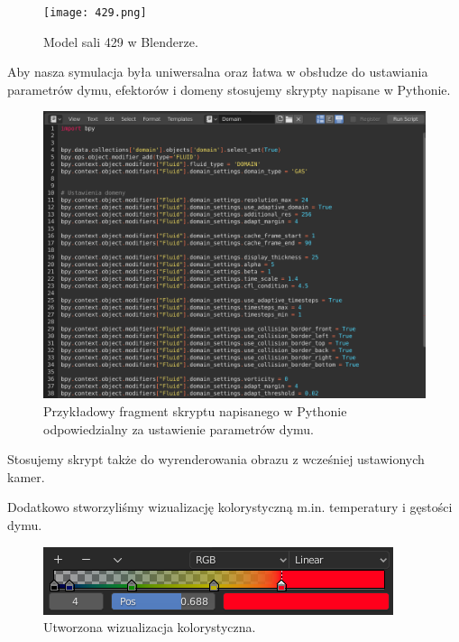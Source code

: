 \documentclass{article}
\begin{document}
            \newpage
            \begin{figure}[h]
                \centering
                \texttt{[image: 429.png]}
                \caption{Model sali 429 w Blenderze.}
            \end{figure}
            
            \medskip
            \noindent Aby nasza symulacja była uniwersalna oraz łatwa w obsłudze do ustawiania parametrów dymu, efektorów i domeny stosujemy skrypty napisane w Pythonie. 
        
            \medskip
            \begin{figure}[ht!]
                \centering
                \includegraphics[scale = 0.4]{sk2.png}
                \caption{Przykładowy fragment skryptu napisanego w Pythonie odpowiedzialny za ustawienie parametrów dymu.}
            \end{figure}
            
            \medskip
            \noindent Stosujemy skrypt także do wyrenderowania obrazu z wcześniej ustawionych kamer.
        
            \medskip
            \noindent Dodatkowo stworzyliśmy wizualizację kolorystyczną m.in. temperatury i gęstości dymu.
            
             \begin{figure}[ht!]
                \centering
                \includegraphics[scale = 0.5]{wizualizacja.png}
                \caption{Utworzona wizualizacja kolorystyczna.}
            \end{figure}
        
\end{document}
